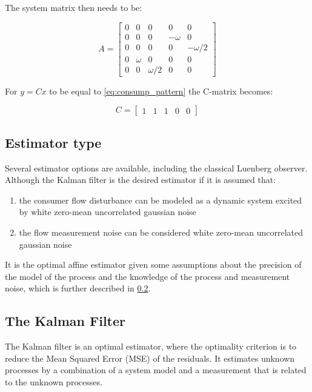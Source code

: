 The system matrix then needs to be:

\begin{equation} \label{eq:consump_A}
	A = \begin{bmatrix}
		0 & 0 				& 0					& 0 				& 0 \\
		0 & 0 				& 0					& -\omega 	& 0 \\
		0 & 0				& 0					& 0 				& - \omega/2 \\
		0 & \omega	& 0						& 0 				& 0 \\
		0 & 0				& \omega/2 	& 0					& 0
	\end{bmatrix}
\end{equation}

For $y = Cx$ to be equal to \cref{eq:consump_pattern} the C-matrix becomes: 

\begin{equation}
	C = \begin{bmatrix} 1 & 1 & 1 & 0 & 0 \end{bmatrix}
\end{equation}

\subsection{Estimator type}
Several estimator options are available, including the classical Luenberg observer. Although the Kalman filter is the desired estimator if it is assumed that:

\begin{enumerate}
	\item the consumer flow disturbance can be modeled as a dynamic system excited by white zero-mean uncorrelated gaussian noise
	\item the flow measurement noise can be considered white zero-mean uncorrelated gaussian noise
\end{enumerate}

It is the optimal affine estimator given some assumptions about the precision of the model of the process and the knowledge of the process and measurement noise, which is further described in \cref{sec:the_kalman_filter}.





\clearpage \newpage
\subsection{The Kalman Filter} \label{sec:the_kalman_filter}
The Kalman filter is an optimal estimator, where the optimality criterion is to reduce the Mean Squared Error (MSE) of the residuals.
It estimates unknown processes by a combination of a system model and a measurement that is related to the unknown processes. 

